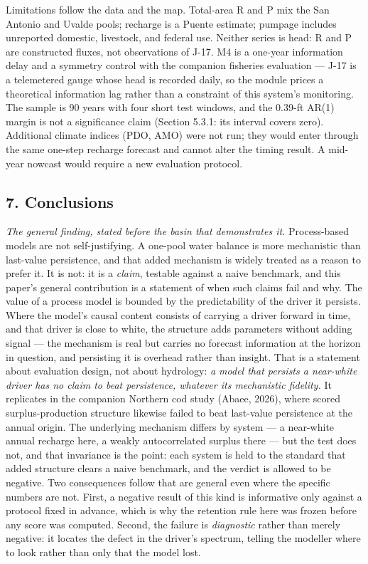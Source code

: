 \documentclass[11pt]{article}
\begin{document}
Limitations follow the data and the map. Total-area R and P mix the San
Antonio and Uvalde pools; recharge is a Puente estimate; pumpage
includes unreported domestic, livestock, and federal use. Neither series
is head: R and P are constructed fluxes, not observations of J-17. M4 is
a one-year information delay and a symmetry control with the companion
fisheries evaluation --- J-17 is a telemetered gauge whose head is
recorded daily, so the module prices a theoretical information lag
rather than a constraint of this system's monitoring. The sample is 90
years with four short test windows, and the 0.39-ft AR(1) margin is not
a significance claim (Section 5.3.1: its interval covers zero).
Additional climate indices (PDO, AMO) were not run; they would enter
through the same one-step recharge forecast and cannot alter the timing
result. A mid-year nowcast would require a new evaluation protocol.

\subsection{7. 
Conclusions}\label{edw-conclusions}

\emph{The general finding, stated before the basin that demonstrates it.} Process-based models are
not self-justifying. A one-pool water balance is more mechanistic than last-value persistence, and
that added mechanism is widely treated as a reason to prefer it. It is not: it is a \emph{claim},
testable against a naive benchmark, and this paper's general contribution is a statement of when
such claims fail and why. The value of a process model is bounded by the predictability of the
driver it persists. Where the model's causal content consists of carrying a driver forward in time,
and that driver is close to white, the structure adds parameters without adding signal --- the
mechanism is real but carries no forecast information at the horizon in question, and persisting it
is overhead rather than insight. That is a statement about evaluation design, not about hydrology:
\emph{a model that persists a near-white driver has no claim to beat persistence, whatever its
mechanistic fidelity.} It replicates in the companion Northern cod study (Abaee, 2026), where scored
surplus-production structure likewise failed to beat last-value persistence at the annual origin.
The underlying mechanism differs by system --- a near-white annual recharge here, a weakly
autocorrelated surplus there --- but the test does not, and that invariance is the point: each
system is held to the standard that added structure clears a naive benchmark, and the verdict is
allowed to be negative. Two consequences follow that are general even where the specific numbers
are not. First, a negative result of this kind is informative only against a protocol fixed in
advance, which is why the retention rule here was frozen before any score was computed. Second, the
failure is \emph{diagnostic} rather than merely negative: it locates the defect in the driver's
spectrum, telling the modeller where to look rather than only that the model lost.
\end{document}
